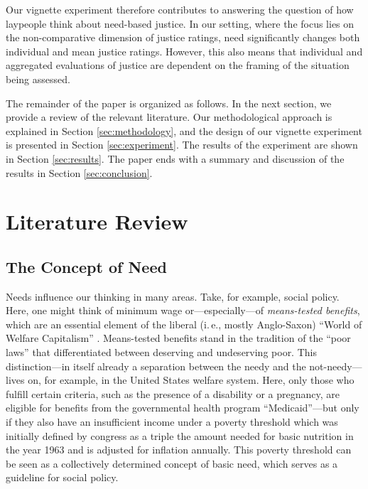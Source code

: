 \documentclass[12pt]{scrartcl}
\begin{document}
Our vignette experiment therefore contributes to answering the question of how laypeople think about need-based justice.
In our setting, where the focus lies on the non-comparative dimension of justice ratings, need significantly changes both individual and mean justice ratings.
However, this also means that individual and aggregated evaluations of justice are dependent on the framing of the situation being assessed.

The remainder of the paper is organized as follows.
In the next section, we provide a review of the relevant literature.
Our methodological approach is explained in Section \ref{sec:methodology}, and the design of our vignette experiment is presented in Section \ref{sec:experiment}.
The results of the experiment are shown in Section \ref{sec:results}.
The paper ends with a summary and discussion of the results in Section \ref{sec:conclusion}.


\section{Literature Review}\label{sec:background}


\subsection{The Concept of Need}\label{sec:need}
Needs influence our thinking in many areas.
Take, for example, social policy.
Here, one might think of minimum wage or---especially---of \textit{means-tested benefits}, which are an essential element of the liberal (i.\,e., mostly Anglo-Saxon) ``World of Welfare Capitalism'' \citep{esping-andersen_three_1990}.
Means-tested benefits stand in the tradition of the ``poor laws'' that differentiated between deserving and undeserving poor.
This distinction---in itself already a separation between the needy and the not-needy---lives on, for example, in the United States welfare system.
Here, only those who fulfill certain criteria, such as the presence of a disability or a pregnancy, are eligible for benefits from the governmental health program ``Medicaid''---but only if they also have an insufficient income under a poverty threshold which was initially defined by congress as a triple the amount needed for basic nutrition in the year 1963 and is adjusted for inflation annually.
This poverty threshold can be seen as a collectively determined concept of basic need, which serves as a guideline for social policy.
\end{document}
